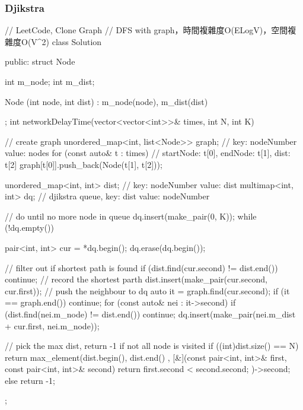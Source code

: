 \subsubsection{Djikstra}
\begin{Code}
// LeetCode, Clone Graph
// DFS with graph，時間複雜度O(ELogV)，空間複雜度O(V^2)
class Solution {
public:
    struct Node {
        int m_node;
        int m_dist;

        Node (int node, int dist)
            : m_node(node), m_dist(dist) {}
    };
    int networkDelayTime(vector<vector<int>>& times, int N, int K) {
        // create graph
        unordered_map<int, list<Node>> graph;  // key: nodeNumber value: nodes
        for (const auto& t : times) // startNode: t[0], endNode: t[1], dist: t[2]
            graph[t[0]].push_back(Node(t[1], t[2]));

        unordered_map<int, int> dist; // key: nodeNumber value: dist
        multimap<int, int> dq; // djikstra queue, key: dist value: nodeNumber

        // do until no more node in queue
        dq.insert(make_pair(0, K));
        while (!dq.empty()) {
            pair<int, int> cur = *dq.begin();
            dq.erase(dq.begin());

            // filter out if shortest path is found
            if (dist.find(cur.second) != dist.end()) continue;
            // record the shortest parth
            dist.insert(make_pair(cur.second, cur.first));
            // push the neighbour to dq
            auto it = graph.find(cur.second);
            if (it == graph.end()) continue;
            for (const auto& nei : it->second) {
                if (dist.find(nei.m_node) != dist.end()) continue;
                dq.insert(make_pair(nei.m_dist + cur.first, nei.m_node));
            }
        }

        // pick the max dist, return -1 if not all node is visited
        if ((int)dist.size() == N)
            return max_element(dist.begin(), dist.end()
              , [&](const pair<int, int>& first, const pair<int, int>& second)
                                {
                                    return first.second < second.second;
                                })->second;
        else
            return -1;
    }
};

\end{Code}

